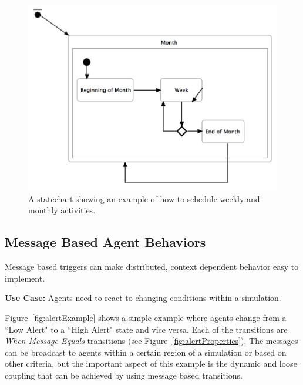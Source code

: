 \documentclass[11pt]{amsart}
\begin{document}
\begin{figure}
\begin{center}
\vspace{.2in}
\centerline {
\includegraphics[width=5in]{StatechartsImages/WeekMonthExample.png}
}
\caption{A statechart showing an example of how to schedule weekly and monthly activities.}
\label{fig:weekMonthExample}
\end{center}
\end{figure}
\clearpage

\subsection{Message Based Agent Behaviors}
Message based triggers can make distributed, context dependent behavior easy to implement.

\textbf{Use Case:} Agents need to react to changing conditions within a simulation.

Figure~\ref{fig:alertExample} shows a simple example where agents change from a ``Low Alert" to a ``High Alert" state and vice versa. Each of the transitions are \emph{When Message Equals} transitions (see Figure~\ref{fig:alertProperties}). The messages can be broadcast to agents within a certain region of a simulation or based on other criteria, but the important aspect of this example is the dynamic and loose coupling that can be achieved by using message based transitions.
\end{document}
